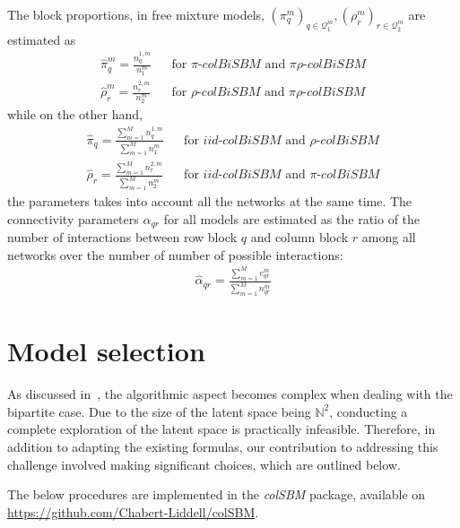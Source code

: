 \documentclass[12pt,a4paper]{report}
\begin{document}
The block proportions, in free mixture models,
$(\pi_q^m)_{q\in\mathcal{Q}_1^m}, (\rho_r^m)_{r\in\mathcal{Q}_2^m}$ are estimated as
\begin{align*}
    \widehat{\pi}_q^{m}= \frac{n^{1,m}_{q}}{n_1^m} & & \text{for } \pi\text{-}colBiSBM \text{ and } \pi\rho\text{-}colBiSBM \\
    \widehat{\rho}_r^{m}= \frac{n^{2,m}_{r}}{n_2^m} & & \text{for } \rho\text{-}colBiSBM \text{ and } \pi\rho\text{-}colBiSBM
\end{align*}
while on the other hand,
\begin{align*}
    \widehat{\pi}_q = \frac{\sum_{m=1}^{M} n^{1,m}_{q}}{\sum_{m=1}^{M} n_1^m} & & \text{for } iid\text{-}colBiSBM \text{ and } \rho\text{-}colBiSBM \\
    \widehat{\rho}_r = \frac{\sum_{m=1}^{M} n^{2,m}_{r}}{\sum_{m=1}^{M} n_2^m} & & \text{for } iid\text{-}colBiSBM \text{ and } \pi\text{-}colBiSBM
\end{align*}
the parameters takes into account all the networks at the same time. The
connectivity parameters $\alpha_{qr}$ for all models are estimated as the ratio
of the number of interactions between row block $q$ and column block $r$ among
all networks over the number of number of possible interactions:
\begin{align*}
    \widehat{\alpha}_{qr} = \frac{\sum_{m=1}^{M} e^{m}_{qr}}{\sum_{m=1}^{M} n^{m}_{qr}}
\end{align*}

\section{Model selection}\label{sec:model-selection}
As discussed in~\cite{chabert-liddellLearningCommonStructures2023}, the
algorithmic aspect becomes complex when dealing with the bipartite case. Due to
the size of the latent space being $\mathbb{N}^2$, conducting a complete
exploration of the latent space is practically infeasible. Therefore, in
addition to adapting the existing formulas, our contribution to addressing this
challenge involved making significant choices, which are outlined below.

The below procedures are implemented in the \emph{colSBM} package, available on \url{https://github.com/Chabert-Liddell/colSBM}.
\end{document}
